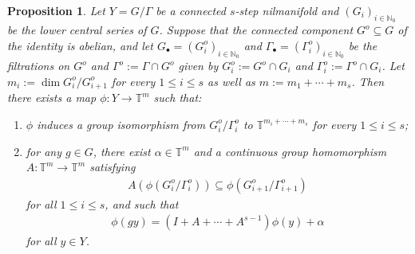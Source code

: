 \documentclass[11pt]{amsart}
\newtheorem{proposition}[lemma]{Proposition}
\theoremstyle{definition}
\newcommand{\N}{{\mathbb N}}
\newcommand{\T}{{\mathbb T}}
\newcommand{\1}{{\mathbf{1}}}
\begin{document}
\begin{proposition}\label{P: isom onto unipotent affine}
    Let $Y=G/\Gamma$ be a connected $s$-step nilmanifold and $(G_i)_{i\in\N_0}$ be the lower central series of $G$.
    Suppose that the connected component $G^o\subseteq G$ of the identity is abelian, and 
    let $G_\bullet = (G_i^o)_{i\in\N_0}$ and $\Gamma_\bullet = (\Gamma_i^o)_{i\in\N_0}$ be the filtrations on $G^o$ and $\Gamma^o:=\Gamma\cap G^o$ given by $G^o_i :=G^o\cap G_i$ and $\Gamma^o_i :=\Gamma^o\cap G_i$. 
    Let $m_i :=\dim G_i^o/G_{i+1}^o$ for every $1\leq i\leq s$ as well as $m:=m_1 + \cdots + m_s$.
    Then there exists a map $\phi\colon Y\to\T^m$ such that:
    \begin{enumerate}
        \item $\phi$ induces a group isomorphism from $G_i^o/\Gamma_i^o$ to $\T^{m_i + \cdots + m_s}$ for every $1\leq i\leq s$;
        \item for any $g\in G$, there exist $\alpha\in\T^m$ and a continuous group homomorphism $A:\T^m\to\T^m$ satisfying
    \begin{align}\label{E: group inclusion}
        A(\phi(G_i^o/\Gamma_i^o))\subseteq \phi(G_{i+1}^o/\Gamma_{i+1}^o)
    \end{align}
    for all $1\leq i\leq s$, and such that
    \begin{align*}
        \phi(gy) = (I+A + \cdots + A^{s-1})\phi(y) + \alpha
    \end{align*}
    for all $y\in Y$.
    \end{enumerate}
\end{proposition}
\end{document}
